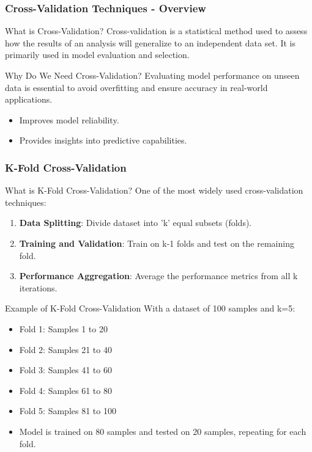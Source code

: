 \documentclass[aspectratio=169]{beamer}
\begin{document}
\begin{frame}[fragile]
    \frametitle{Cross-Validation Techniques - Overview}
    \begin{block}{What is Cross-Validation?}
        Cross-validation is a statistical method used to assess how the results of an analysis will generalize to an independent data set.
        It is primarily used in model evaluation and selection.
    \end{block}
    \begin{block}{Why Do We Need Cross-Validation?}
        Evaluating model performance on unseen data is essential to avoid overfitting and ensure accuracy in real-world applications.
        \begin{itemize}
            \item Improves model reliability.
            \item Provides insights into predictive capabilities.
        \end{itemize}
    \end{block}
\end{frame}

\begin{frame}[fragile]
    \frametitle{K-Fold Cross-Validation}
    \begin{block}{What is K-Fold Cross-Validation?}
        One of the most widely used cross-validation techniques:
        \begin{enumerate}
            \item \textbf{Data Splitting}: Divide dataset into 'k' equal subsets (folds).
            \item \textbf{Training and Validation}: Train on k-1 folds and test on the remaining fold.
            \item \textbf{Performance Aggregation}: Average the performance metrics from all k iterations.
        \end{enumerate}
    \end{block}
    
    \begin{block}{Example of K-Fold Cross-Validation}
        With a dataset of 100 samples and k=5:
        \begin{itemize}
            \item Fold 1: Samples 1 to 20
            \item Fold 2: Samples 21 to 40
            \item Fold 3: Samples 41 to 60
            \item Fold 4: Samples 61 to 80
            \item Fold 5: Samples 81 to 100
            \item Model is trained on 80 samples and tested on 20 samples, repeating for each fold.
        \end{itemize}
    \end{block}
\end{frame}
\end{document}
